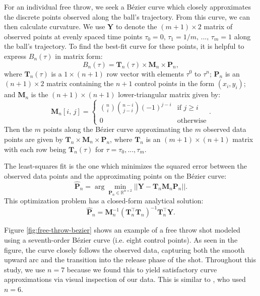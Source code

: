 \documentclass{article}
\begin{document}
            For an individual free throw, we seek a Bézier curve which closely approximates the discrete points observed along the ball's trajectory. From this curve, we can then calculate curvature. We use \(\mathbf{Y}\) to denote the \( (m + 1) \times 2\) matrix of observed points at evenly spaced time points $\tau_0 = 0,\, \tau_1 = 1 / m,\, ...,\, \tau_m = 1$ along the ball's trajectory. To find the best-fit curve for these points, it is helpful to express \(B_n(\tau)\) in matrix form:
            \[
              B_n(\tau) = \mathbf{T}_n(\tau) \times \mathbf{M}_n \times \mathbf{P}_n,
            \]
            where \( \mathbf{T}_n(\tau) \) is a \( 1 \times (n+1) \) row vector with elements \( \tau^0 \) to \( \tau^n \); \( \mathbf{P}_n \) is an \( (n+1) \times 2 \) matrix containing the \( n+1 \) control points in the form \( (x_i, y_i) \); and \( \mathbf{M}_n \) is the \( (n+1) \times (n+1) \) lower-triangular matrix given by:
            \[
              \mathbf{M}_n[i,\, j] = \begin{cases}
                  \binom{n}{i} \binom{n - i} {j - i} (-1)^{j - i} & \mbox{if } j \ge i\\
                  0 & \mbox{otherwise}
              \end{cases}.
            \]
            Then the $m$ points along the Bézier curve approximating the $m$ observed data points are given by $\mathbf{T}_n \times \mathbf{M}_n \times \mathbf{P}_n$, where \( \mathbf{T}_n \) is an \( (m + 1) \times (n+1) \) matrix with each row being \( \mathbf{T}_n(\tau) \) for $\tau = \tau_0, ..., \tau_m$.

            The least-squares fit is the one which minimizes the squared error between the observed data points and the approximating points on the Bézier curve:
            \[
              \hat{\mathbf{P}}_n = \arg\min_{\mathbf{P}_n \in \mathbb{R}^{n \times 2}} ||\mathbf{Y} - \mathbf{T}_n \mathbf{M}_n \mathbf{P}_n||.
            \]
            This optimization problem has a closed-form analytical solution:
            \[
              \hat{\mathbf{P}}_n = \mathbf{M}_n^{-1} (\mathbf{T}_n^\top \mathbf{T}_n)^{-1} \mathbf{T}_n^\top \mathbf{Y}.
            \]
            
            Figure \ref{fig:free-throw-bezier} shows an example of a free throw shot modeled using a seventh-order Bézier curve (i.e. eight control points). As seen in the figure, the curve closely follows the observed data, capturing both the smooth upward arc and the transition into the release phase of the shot. Throughout this study, we use $n = 7$ because we found this to yield satisfactory curve approximations via visual inspection of our data. This is similar to \citet{slegers_role_2024}, who used $n = 6$.
            
\end{document}

